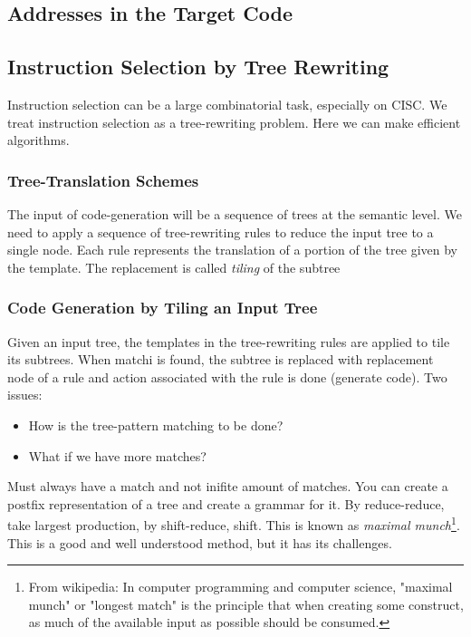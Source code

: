 \documentclass{article}
\begin{document}
\subsection{Addresses in the Target Code} %
\label{sub:Addresses in the Target Code}


\subsection{Instruction Selection by Tree Rewriting} %
\label{sub:Instruction Selection by Tree Rewriting}
Instruction selection can be a large combinatorial task, especially on CISC. We treat instruction selection as a tree-rewriting problem. Here we can make efficient algorithms.

\subsubsection{Tree-Translation Schemes} %
\label{ssub:Tree-Translation Schemes}
The input of code-generation will be a sequence of trees at the semantic level. We need to apply a sequence of tree-rewriting rules to reduce the input tree to a single node. Each rule represents the translation of a portion of the tree given by the template. The replacement is called \emph{tiling} of the subtree

\subsubsection{Code Generation by Tiling an Input Tree} %
\label{ssub:Code Generation by Tiling an Input Tree}
Given an input tree, the templates in the tree-rewriting rules are applied to tile its subtrees. When matchi is found, the subtree is replaced with replacement node of a rule and action associated with the rule is done (generate code). Two issues:
\begin{itemize}
	\item How is the tree-pattern matching to be done?
	\item What if we have more matches?
\end{itemize}
Must always have a match and not inifite amount of matches. You can create a postfix representation of a tree and create a grammar for it. By reduce-reduce, take largest production, by shift-reduce, shift. This is known as \emph{maximal munch}\footnote{From wikipedia: In computer programming and computer science, "maximal munch" or "longest match" is the principle that when creating some construct, as much of the available input as possible should be consumed.}. This is a good and well understood method, but it has its challenges.
\end{document}

